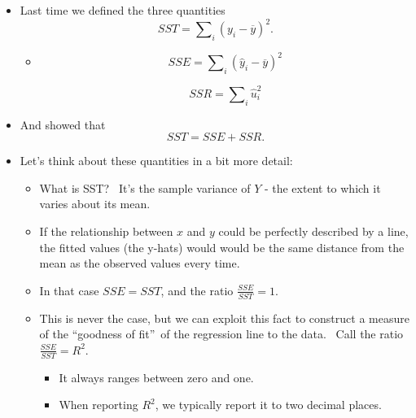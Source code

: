\documentclass[11pt]{article}
\begin{document}
\begin{itemize}
\item Last time we defined the three quantities%
\begin{equation*}
SST=\sum\nolimits_{i}\left( y_{i}-\overline{y}\right) ^{2}.
\end{equation*}

\begin{itemize}
\item 
\begin{equation*}
SSE=\sum\nolimits_{i}\left( \widehat{y}_{i}-\overline{y}\right) ^{2}
\end{equation*}

\begin{equation*}
SSR=\sum\nolimits_{i}\widehat{u}_{i}^{2}
\end{equation*}
\end{itemize}

\item And showed that 
\begin{equation*}
SST=SSE+SSR.
\end{equation*}

\item Let's think about these quantities in a bit more detail: \ 

\begin{itemize}
\item What is SST? \ It's the sample variance of $Y$ - the extent to which
it varies about its mean. \ 

\item If the relationship between $x$ and $y$ could be perfectly described
by a line, the fitted values (the y-hats) would would be the same distance
from the mean as the observed values every time.

\item In that case $SSE=SST$, and the ratio $\frac{SSE}{SST}=1.$

\item This is never the case, but we can exploit this fact to construct a
measure of the \textquotedblleft goodness of fit\textquotedblright\ of the
regression line to the data. \ Call the ratio $\frac{SSE}{SST}=R^{2}.$ \ 

\begin{itemize}
\item It always ranges between zero and one.

\item When reporting $R^{2}$, we typically report it to two decimal places.


\end{itemize}
\end{itemize}
\end{itemize}
\end{document}
